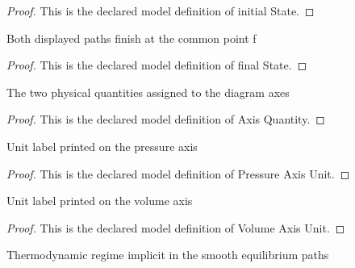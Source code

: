 \begin{proof}
  This is the declared model definition of initial State.
\end{proof}
\begin{definition}
  \label{def:physics:phyx-mini-0410:phyxminiproblems-problemphyxmini0410-processpath-finalstate}
  Both displayed paths finish at the common point f
\end{definition}
\begin{proof}
  This is the declared model definition of final State.
\end{proof}
\begin{definition}
  \label{def:physics:phyx-mini-0410:phyxminiproblems-problemphyxmini0410-axisquantity}
  The two physical quantities assigned to the diagram axes
\end{definition}
\begin{proof}
  This is the declared model definition of Axis Quantity.
\end{proof}
\begin{definition}
  \label{def:physics:phyx-mini-0410:phyxminiproblems-problemphyxmini0410-pressureaxisunit}
  Unit label printed on the pressure axis
\end{definition}
\begin{proof}
  This is the declared model definition of Pressure Axis Unit.
\end{proof}
\begin{definition}
  \label{def:physics:phyx-mini-0410:phyxminiproblems-problemphyxmini0410-volumeaxisunit}
  Unit label printed on the volume axis
\end{definition}
\begin{proof}
  This is the declared model definition of Volume Axis Unit.
\end{proof}
\begin{definition}
  \label{def:physics:phyx-mini-0410:phyxminiproblems-problemphyxmini0410-processregime}
  Thermodynamic regime implicit in the smooth equilibrium paths
\end{definition}
